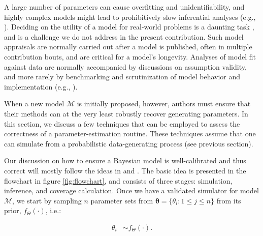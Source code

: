 \documentclass[oneside]{article}
\begin{document}
A large number of parameters can cause overfitting and unidentifiability,
and highly complex models might lead to prohibitively slow inferential analyses
(e.g., \citealp{lartillot11}).
Deciding on the utility of a model for real-world problems is a
daunting task \citep{brown18,shepherd18}, and is a challenge we do not address in
the present contribution.
Such model appraisals are normally carried out after a model is
published, often in multiple contribution bouts, and are critical for a model's
longevity.
Analyses of model fit against data are normally accompanied by discussions on
assumption validity, and more rarely by benchmarking and scrutinization of model
behavior and implementation (e.g., \citealp{maddison07,rabosky15,rabosky13,moore16,stadler10,luo20}).

When a new model $\mathcal{M}$ is initially proposed, however, authors must ensure
that their methods
can at the very least robustly recover generating parameters.
In this section, we discuss a few techniques that can be employed to assess
the correctness of a parameter-estimation routine.
These techniques assume that one can simulate from a probabilistic data-generating
process (see previous section).

\vspace{.25cm}


Our discussion on how to ensure a Bayesian model is well-calibrated
and thus correct will mostly follow the ideas in \citet{Cook2006} and \citet{Talts2018}.
The basic idea is presented in the flowchart in figure \ref{fig:flowchart}, and
consists of three stages: simulation, inference, and coverage calculation.
Once we have a validated simulator for model $\mathcal{M}$, we start by sampling $n$ parameter
sets from
$\boldsymbol{\theta} = \{\theta_i: 1 \leq j \leq n\}$ from its prior,
$f_\Theta(\cdot)$, i.e.:

\vspace{-1cm}
\begin{align*}
 \theta_i & \sim f_\Theta(\cdot).
\end{align*}
\end{document}
